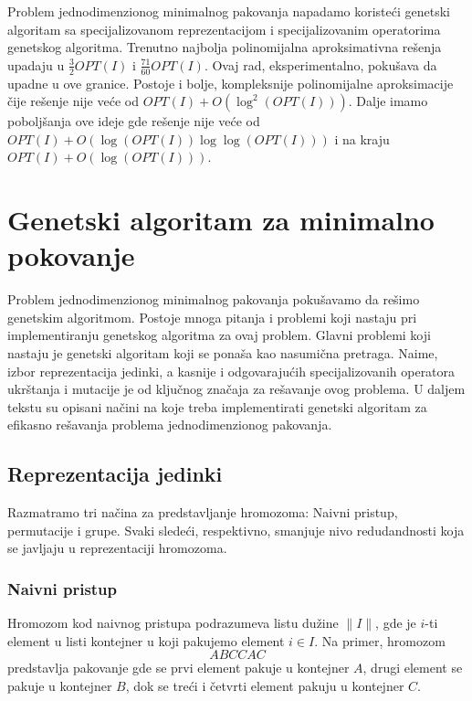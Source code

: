 \documentclass[a4paper,12pt,twocolumn]{article}
\begin{document}
Problem jednodimenzionog minimalnog pakovanja napadamo
koristeći genetski algoritam sa specijalizovanom reprezentacijom i 
specijalizovanim operatorima genetskog algoritma. Trenutno najbolja 
polinomijalna aproksimativna rešenja upadaju u $\frac{3}{2} OPT(I)$\cite{sl94} 
i $\frac{71}{60} OPT(I)$\cite{jg85, yz95}. Ovaj rad, eksperimentalno, pokušava 
da upadne u ove granice. Postoje i bolje, kompleksnije polinomijalne 
aproksimacije čije rešenje nije veće od 
$OPT(I) + O(\log^2 (OPT(I)))$\cite{kk82}. Dalje imamo poboljšanja ove ideje
gde rešenje nije veće od
$OPT(I) + O(\log(OPT(I))\log\log(OPT(I)))$\cite{r13} i na kraju
$OPT(I) + O(\log(OPT(I)))$\cite{hr17}.


\section{Genetski algoritam za minimalno pokovanje}

Problem jednodimenzionog minimalnog pakovanja pokušavamo da rešimo genetskim
algoritmom. Postoje mnoga pitanja i problemi koji nastaju pri implementiranju 
genetskog algoritma za ovaj problem. Glavni problemi koji nastaju je genetski
algoritam koji se ponaša kao nasumična pretraga\cite{f96}. Naime, izbor 
reprezentacija jedinki, a kasnije i odgovarajućih specijalizovanih operatora
ukrštanja i mutacije je od ključnog značaja za rešavanje ovog problema. 
U daljem tekstu su opisani načini na koje treba implementirati genetski 
algoritam za efikasno rešavanja problema jednodimenzionog pakovanja.

\subsection{Reprezentacija jedinki}

Razmatramo tri načina za predstavljanje hromozoma: Naivni pristup, 
permutacije i grupe. Svaki sledeći, respektivno, smanjuje nivo redudandnosti
koja se javljaju u reprezentaciji hromozoma.

\subsubsection{Naivni pristup}

Hromozom kod naivnog pristupa podrazumeva listu dužine $\|I\|$, gde je $i$-ti
element u listi kontejner u koji pakujemo element $i \in I$. Na primer, 
hromozom
\[ABCCAC\]
predstavlja pakovanje gde se prvi element pakuje u kontejner $A$, drugi 
element se pakuje u kontejner $B$, dok se treći i četvrti element pakuju u 
kontejner $C$.
\end{document}
